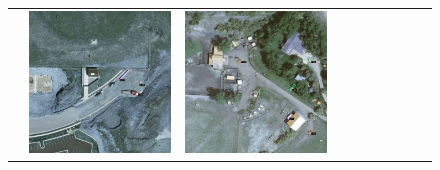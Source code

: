 \begin{figure}[H]
\begin{tabularx}{\textwidth}{c|*{9}{X}}
    & \includegraphics[trim={440pt 360pt 460pt 555pt},clip,width=\linewidth]{images/015Results/02perm_exp/comp_images/rgb/427.png}
    & \includegraphics[trim={740pt 420pt 180pt 510pt},clip,width=\linewidth]{images/015Results/02perm_exp/comp_images/rgb/523.png}

\end{tabularx}
\end{figure}
